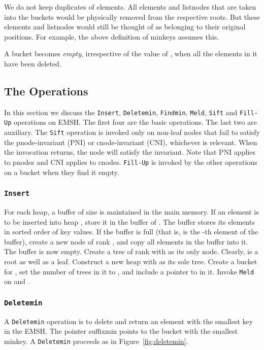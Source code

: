 We do not keep duplicates of elements. 
All elements and listnodes that are taken into the buckets would be 
	physically removed from the respective roots.
But these elements and listnodes would still be thought of as belonging to their
	original positions.
For example, the above definition of minkeys assumes this.

A bucket  becomes {\em empty}, irrespective of the value of ,
when all the elements in it have been deleted. 

	



\subsection{The Operations}

In this section we discuss the {\tt Insert}, {\tt Deletemin}, {\tt Findmin}, {\tt Meld}, {\tt Sift} and {\tt Fill-Up} 
    operations on EMSH. The first four are the basic operations. 
The last two are auxiliary.
The {\tt Sift} operation is invoked only on non-leaf nodes that fail to satisfy the 
	pnode-invariant (PNI) or cnode-invariant (CNI), whichever is relevant.
When the invocation returns, the node will satisfy the invariant.
Note that PNI applies to pnodes and CNI applies to cnodes. 
{\tt Fill-Up} is invoked by the other operations on a bucket when they find it empty.

\subsubsection{{\tt Insert}}
For each heap, a buffer of size  is maintained in the main memory. 
If an element  is to be inserted into heap , store it in the buffer of . 
The buffer stores its elements in sorted order of key values. 
If the buffer is full (that is,  is the -th  element of the buffer), 
	create a new node  of rank , and copy all elements in the buffer into it.
The buffer is now empty.
Create a tree  of rank  with  as its only node. 
Clearly,  is a root as well as a leaf. 
Construct a new heap  with  as its sole tree. 
Create a bucket  for , set the number of trees in it to , and include a pointer to  in it.
Invoke {\tt Meld} on  and .

\subsubsection{{\tt Deletemin}}
A {\tt Deletemin} operation is to delete and return an element with the smallest key in the EMSH.
The pointer suffixmin points to the bucket with the smallest minkey.
A {\tt Deletemin} proceeds as in Figure~\ref{fig:deletemin}.

